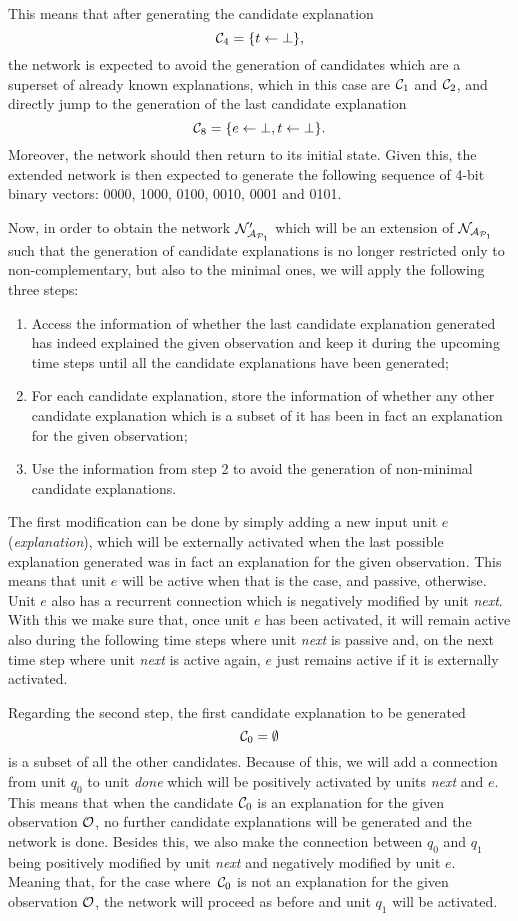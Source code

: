 This means that after generating the candidate explanation 
\[\mathcal{C}_4 = \{t \leftarrow \bot\},
\]
the network is expected to avoid the generation of candidates which are a superset of already known explanations, which in this case are $\mathcal{C}_1$ and $\mathcal{C}_2$, and directly jump to the generation of the last candidate explanation
\[
\mathcal{C}_8 = \{e \leftarrow \bot, t \leftarrow \bot\}.
\]
Moreover, the network should then return to its initial state. Given this, the extended network is then expected to generate the following sequence of 4-bit binary vectors: 0000, 1000, 0100, 0010, 0001 and 0101.

Now, in order to obtain the network $\mathcal{N}'_{\mathcal{A}_{\mathcal{P}_1}}$ which will be an extension of $\mathcal{N}_{\mathcal{A}_{\mathcal{P}_1}}$ such that the generation of candidate explanations is no longer restricted only to non-complementary, but also to the minimal ones, we will apply the following three steps:

\begin{enumerate}
\item Access the information of whether the last candidate explanation generated has indeed explained the given observation and keep it during the upcoming time steps until all the candidate explanations have been generated;
\item For each candidate explanation, store the information of whether any other candidate explanation which is a subset of it has been in fact an explanation for the given observation;
\item Use the information from step 2 to avoid the generation of non-minimal candidate explanations.
\end{enumerate}

The first modification can be done by simply adding a new input unit $e$ (\textit{explanation}), which will be externally activated when the last possible explanation generated was in fact an explanation for the given observation. This means that unit $e$ will be active when that is the case, and passive, otherwise. Unit $e$ also has a recurrent connection which is negatively modified by unit \textit{next}. With this we make sure that, once unit $e$ has been activated, it will remain active also during the following time steps where unit \textit{next} is passive and, on the next time step where unit \textit{next} is active again, $e$ just remains active if it is externally activated.

Regarding the second step, the first candidate explanation to be generated
\[
\mathcal{C}_0 = \emptyset
\]
is a subset of all the other candidates. Because of this, we will add a connection from unit $q_0$ to unit \textit{done} which will be positively activated by units \textit{next} and $e$. This means that when the candidate $\mathcal{C}_0$ is an explanation for the given observation $\mathcal{O}$, no further candidate explanations will be generated and the network is done. Besides this, we also make the connection between $q_0$ and $q_1$ being positively modified by unit \textit{next} and negatively modified by unit $e$. Meaning that, for the case where~$\mathcal{C}_0$ is not an explanation for the given observation $\mathcal{O}$, the network will proceed as before and unit $q_1$ will be activated.

